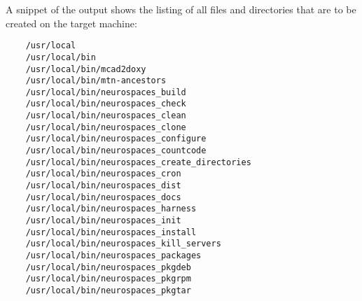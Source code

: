 \documentclass[12pt]{article}
\begin{document}
A snippet of the output shows the listing of all files and directories that are to be created on the target machine:

\begin{verbatim}
	/usr/local
	/usr/local/bin
	/usr/local/bin/mcad2doxy
	/usr/local/bin/mtn-ancestors
	/usr/local/bin/neurospaces_build
	/usr/local/bin/neurospaces_check
	/usr/local/bin/neurospaces_clean
	/usr/local/bin/neurospaces_clone
	/usr/local/bin/neurospaces_configure
	/usr/local/bin/neurospaces_countcode
	/usr/local/bin/neurospaces_create_directories
	/usr/local/bin/neurospaces_cron
	/usr/local/bin/neurospaces_dist
	/usr/local/bin/neurospaces_docs
	/usr/local/bin/neurospaces_harness
	/usr/local/bin/neurospaces_init
	/usr/local/bin/neurospaces_install
	/usr/local/bin/neurospaces_kill_servers
	/usr/local/bin/neurospaces_packages
	/usr/local/bin/neurospaces_pkgdeb
	/usr/local/bin/neurospaces_pkgrpm
	/usr/local/bin/neurospaces_pkgtar
\end{verbatim}
\end{document}
